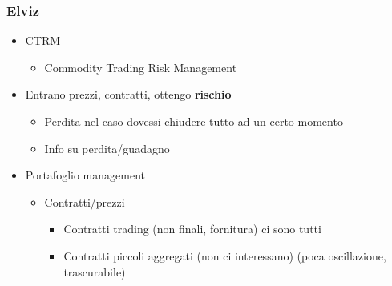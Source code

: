 \subsubsection{Elviz}
    \begin{itemize}
        \item CTRM
            \begin{itemize}
                \item Commodity Trading Risk Management
            \end{itemize}
        \item Entrano prezzi, contratti, ottengo \textbf{rischio}
            \begin{itemize}
                \item Perdita nel caso dovessi chiudere tutto ad un certo momento
                \item Info su perdita/guadagno
            \end{itemize}
        \item Portafoglio management
            \begin{itemize}
                \item Contratti/prezzi
                    \begin{itemize}
                        \item Contratti trading (non finali, fornitura) ci sono tutti
                        \item Contratti piccoli aggregati (non ci interessano) (poca oscillazione, trascurabile)
                    \end{itemize}
            \end{itemize}
    \end{itemize}
